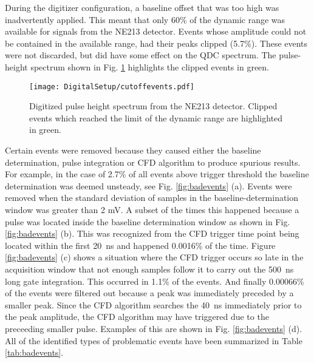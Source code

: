\documentclass[main.tex]{subfiles}
\begin{document}
During the digitizer configuration, a baseline offset that was too high was inadvertently applied. This meant that only 60\% of the dynamic range was available for signals from the NE213 detector. Events whose amplitude could not be contained in the available range, had their peaks clipped (5.7\%). These events were not discarded, but did have some effect on the QDC spectrum. The pulse-height spectrum shown in Fig. \ref{fig:cutoffevents} highlights the clipped events in green.
\begin{figure}[hb!]
    \centering
        \texttt{[image: DigitalSetup/cutoffevents.pdf]}
        \caption[Digitized pulse-height spectrum]{Digitized pulse height spectrum from the NE213 detector. Clipped events which reached the limit of the dynamic range are highlighted in green.}
    \label{fig:cutoffevents} 
\end{figure}

Certain events were removed because they caused either the baseline determination, pulse integration or CFD algorithm to produce spurious results. For example, in the case of 2.7\% of all events above trigger threshold the baseline determination was deemed unsteady, see Fig. \ref{fig:badevents} (a). Events were removed when the standard deviation of samples in the baseline-determination window was greater than 2 mV. A subset of the times this happened because a pulse was located inside the baseline determination window as shown in Fig. \ref{fig:badevents} (b). This was recognized from the CFD trigger time point being located within the first \SI{20}{ns} and happened 0.0016\% of the time. Figure \ref{fig:badevents} (c) shows a situation where the CFD trigger occurs so late in the acquisition window that not enough samples follow it to carry out the \SI{500}{\nano\second} long gate integration. This occurred in 1.1\% of the events. And finally 0.00066\% of the events were filtered out because a peak was immediately  preceded by a smaller peak. Since the CFD algorithm searches the \SI{40}{ns} immediately prior to the peak amplitude, the CFD algorithm may have triggered due to the preceeding smaller pulse. Examples of this are shown in Fig. \ref{fig:badevents} (d). All of the identified types of problematic events have been summarized in Table \ref{tab:badevents}.
\end{document}
